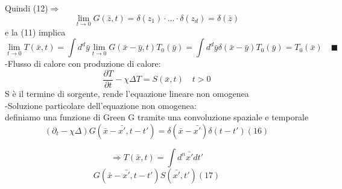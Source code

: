 \documentclass[a4paper,11pt]{report}
\begin{document}
Quindi (12)$\Rightarrow$
$$
\lim_{t\to 0} G(\bar{z},t)=\delta(z_1)\cdot\dots\cdot\delta(z_d)=\delta(\bar{z})
$$
e la (11) implica 
$$
\lim_{t\to 0}T(\bar{x},t)=\int d^d\bar{y}\lim_{t\to 0}G(\bar{x}-\bar{y},t)T_0(\bar{y})=\int d^d \bar{y}\delta(\bar{x}-\bar{y})T_0(\bar{y})=T_0(\bar{x}) \quad \blacksquare
$$
-Flusso di calore con produzione di calore:
$$
\dfrac{\partial T}{\partial t} -\chi\Delta T=S(\bar{x},t) \quad t>0
$$
S è il termine di sorgente, rende l'equazione lineare non omogenea\\
-Soluzione particolare dell'equazione non omogenea:\\
definiamo una funzione di Green G tramite una convoluzione spaziale e temporale
\begin{equation}
\left(\partial_t-\chi\Delta\right)G(\bar{x}-\bar{x'},t-t')=\delta(\bar{x}-\bar{x'})\delta(t-t') (16)
\end{equation}

$$
\Rightarrow T(\bar{x},t)=\int d^n\bar{x'}dt'
$$
\begin{equation}
G(\bar{x}-\bar{x'},t-t')S(\bar{x'},t') (17)
\end{equation}
\end{document}
